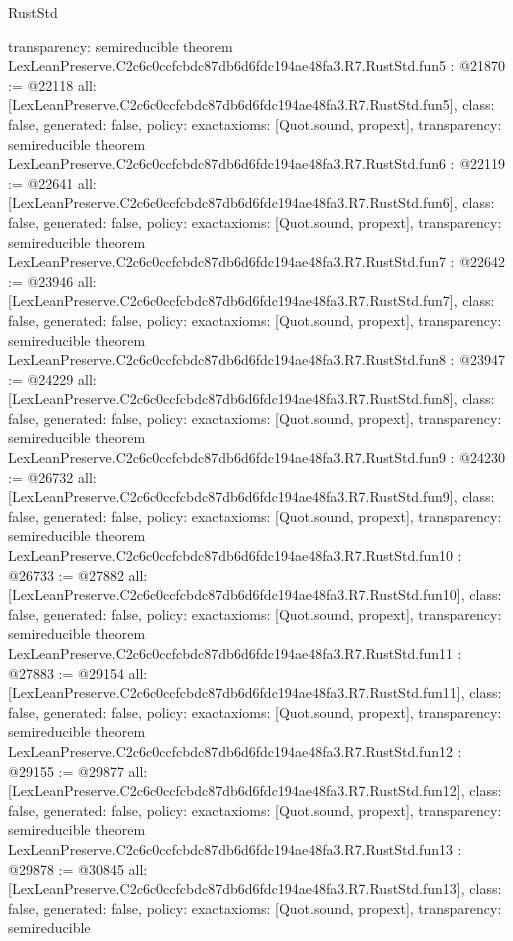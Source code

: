 \begin{lexlean}{RustStd}
\begin{coremodule}
{  transparency: semireducible
}
theorem LexLeanPreserve.C2c6c0ccfcbdc87db6d6fdc194ae48fa3.R7.RustStd.fun5 : @21870 := @22118 {
  all: [LexLeanPreserve.C2c6c0ccfcbdc87db6d6fdc194ae48fa3.R7.RustStd.fun5],
  class: false,
  generated: false,
  policy: exact{axioms: [Quot.sound, propext]},
  transparency: semireducible
}
theorem LexLeanPreserve.C2c6c0ccfcbdc87db6d6fdc194ae48fa3.R7.RustStd.fun6 : @22119 := @22641 {
  all: [LexLeanPreserve.C2c6c0ccfcbdc87db6d6fdc194ae48fa3.R7.RustStd.fun6],
  class: false,
  generated: false,
  policy: exact{axioms: [Quot.sound, propext]},
  transparency: semireducible
}
theorem LexLeanPreserve.C2c6c0ccfcbdc87db6d6fdc194ae48fa3.R7.RustStd.fun7 : @22642 := @23946 {
  all: [LexLeanPreserve.C2c6c0ccfcbdc87db6d6fdc194ae48fa3.R7.RustStd.fun7],
  class: false,
  generated: false,
  policy: exact{axioms: [Quot.sound, propext]},
  transparency: semireducible
}
theorem LexLeanPreserve.C2c6c0ccfcbdc87db6d6fdc194ae48fa3.R7.RustStd.fun8 : @23947 := @24229 {
  all: [LexLeanPreserve.C2c6c0ccfcbdc87db6d6fdc194ae48fa3.R7.RustStd.fun8],
  class: false,
  generated: false,
  policy: exact{axioms: [Quot.sound, propext]},
  transparency: semireducible
}
theorem LexLeanPreserve.C2c6c0ccfcbdc87db6d6fdc194ae48fa3.R7.RustStd.fun9 : @24230 := @26732 {
  all: [LexLeanPreserve.C2c6c0ccfcbdc87db6d6fdc194ae48fa3.R7.RustStd.fun9],
  class: false,
  generated: false,
  policy: exact{axioms: [Quot.sound, propext]},
  transparency: semireducible
}
theorem LexLeanPreserve.C2c6c0ccfcbdc87db6d6fdc194ae48fa3.R7.RustStd.fun10 : @26733 := @27882 {
  all: [LexLeanPreserve.C2c6c0ccfcbdc87db6d6fdc194ae48fa3.R7.RustStd.fun10],
  class: false,
  generated: false,
  policy: exact{axioms: [Quot.sound, propext]},
  transparency: semireducible
}
theorem LexLeanPreserve.C2c6c0ccfcbdc87db6d6fdc194ae48fa3.R7.RustStd.fun11 : @27883 := @29154 {
  all: [LexLeanPreserve.C2c6c0ccfcbdc87db6d6fdc194ae48fa3.R7.RustStd.fun11],
  class: false,
  generated: false,
  policy: exact{axioms: [Quot.sound, propext]},
  transparency: semireducible
}
theorem LexLeanPreserve.C2c6c0ccfcbdc87db6d6fdc194ae48fa3.R7.RustStd.fun12 : @29155 := @29877 {
  all: [LexLeanPreserve.C2c6c0ccfcbdc87db6d6fdc194ae48fa3.R7.RustStd.fun12],
  class: false,
  generated: false,
  policy: exact{axioms: [Quot.sound, propext]},
  transparency: semireducible
}
theorem LexLeanPreserve.C2c6c0ccfcbdc87db6d6fdc194ae48fa3.R7.RustStd.fun13 : @29878 := @30845 {
  all: [LexLeanPreserve.C2c6c0ccfcbdc87db6d6fdc194ae48fa3.R7.RustStd.fun13],
  class: false,
  generated: false,
  policy: exact{axioms: [Quot.sound, propext]},
  transparency: semireducible
}
\end{coremodule}
\end{lexlean}

